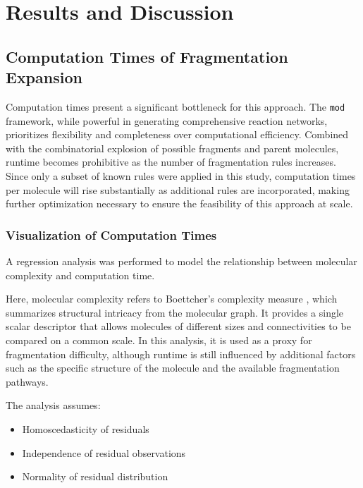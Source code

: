 \chapter{Results and Discussion}
\label{ch:4}
\noindent

\section{Computation Times of Fragmentation Expansion}

Computation times present a significant bottleneck for this approach. 
The \texttt{mod} framework, while powerful in generating comprehensive reaction networks, 
prioritizes flexibility and completeness over computational efficiency. 
Combined with the combinatorial explosion of possible fragments and parent molecules, 
runtime becomes prohibitive as the number of fragmentation rules increases. 
Since only a subset of known rules were applied in this study, 
computation times per molecule will rise substantially as additional rules are incorporated, 
making further optimization necessary to ensure the feasibility of this approach at scale.

\subsection{Visualization of Computation Times}

A regression analysis was performed to model the relationship between molecular complexity and computation time. 

Here, molecular complexity refers to Boettcher's complexity measure \cite{Boettcher2016}, which summarizes
structural intricacy from the molecular graph. It provides a single scalar descriptor that allows molecules
of different sizes and connectivities to be compared on a common scale. In this analysis, it is used as a
proxy for fragmentation difficulty, although runtime is still influenced by additional factors such as the
specific structure of the molecule and the available fragmentation pathways.

The analysis assumes:
\begin{itemize}[noitemsep,topsep=0pt]
    \item Homoscedasticity of residuals
    \item Independence of residual observations
    \item Normality of residual distribution
\end{itemize}

